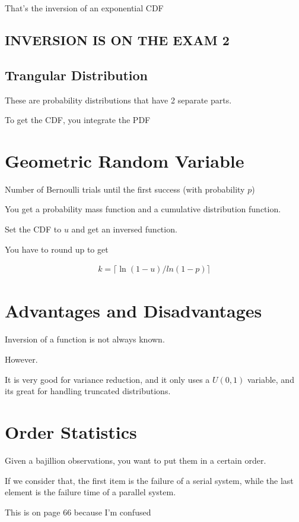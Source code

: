 \documentclass[fleqn]{report}
\newcommand{\equations} [1] {
\begin{gather*}
#1
\end{gather*}
}
\begin{document}
That's the inversion of an exponential CDF 

\subsection{INVERSION IS ON THE EXAM 2}

\subsection{Trangular Distribution}
These are probability distributions that have 2 separate parts. 

To get the CDF, you integrate the PDF 

\section{Geometric Random Variable}
Number of Bernoulli trials until the first success (with probability $p$) 

You get a probability mass function and a cumulative distribution function. 

Set the CDF to $u$ and get an inversed function. 

You have to round up to get 

\equations{
    k = \lceil \ln(1 - u) / ln(1 - p) \rceil
}

\section{Advantages and Disadvantages}
Inversion of a function is not always known. 

However. 

It is very good for variance reduction, and it only uses a $U(0, 1)$ variable, 
and its great for handling truncated distributions. 

\section{Order Statistics}
Given a bajillion observations, you want to put them in a certain order. 

If we consider that, the first item is the failure of a serial system, while 
the last element is the failure time of a parallel system. 


This is on page 66 because I'm confused 
\end{document}
